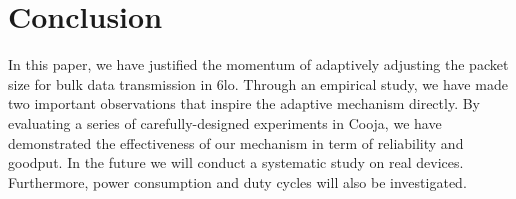 \documentclass[runningheads,a4paper]{llncs}
\begin{document}
\section{Conclusion}
In this paper, we have justified the momentum of adaptively adjusting the packet size for bulk data transmission in 6lo. Through an empirical study, we have made two important observations that inspire the adaptive mechanism directly. By evaluating a series of carefully-designed experiments in Cooja, we have demonstrated the effectiveness of our mechanism in term of reliability and goodput. In the future we will conduct a systematic study on real devices. Furthermore, power consumption and duty cycles will also be investigated.



\end{document}
